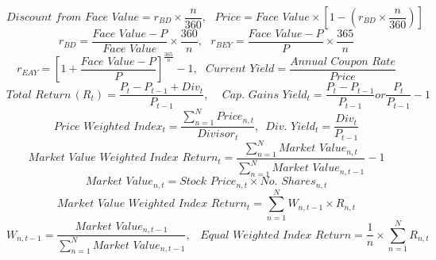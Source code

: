 $$Discount \,\, from \,\, Face \,\, Value = r_{BD} \times \frac{n}{360}, \,\,\,\, Price = Face\,\, Value \times \left[1 - (r_{BD} \times \frac{n}{360})\right]$$
$$r_{BD} = \frac{Face \,\, Value - P}{Face \,\, Value}\times \frac{360}{n},\,\,\,\, r_{BEY} = \frac{Face \,\, Value - P}{P}\times \frac{365}{n}$$
$$r_{EAY} = \left[1 + \frac{Face \,\, Value - P}{P} \right]^{\frac{365}{n}}-1, \,\,\,\, Current \,\, Yield = \frac{Annual \,\, Coupon \,\, Rate}{Price}$$
$$Total \,\, Return \, (R_{t}) = \frac{P_{t}-P_{t-1}+Div_{t}}{P_{t-1}},  \,\,\,\,\,\,\, Cap. \,\, Gains \,\, Yield_{t} = \frac{P_{t}- P_{t-1}}{P_{t-1}} or \frac{P_{t}}{P_{t-1}}-1$$
$$Price \,\, Weighted \,\, Index_{t} = \frac{\sum_{n=1}^{N}Price_{n,t}}{Divisor_{t}},\,\,\, Div. \,\, Yield_{t} = \frac{Div_{t}}{P_{t-1}}$$
$$Market \,\, Value \,\, Weighted \,\, Index \,\, Return_{t} = \frac{\sum_{n=1}^{N}Market \,\, Value_{n,t}}{\sum_{n=1}^{N}Market \,\, Value_{n,t-1}}-1$$
$$Market \,\, Value_{n,t} = Stock \,\, Price_{n,t} \times No. \,\, Shares_{n,t}$$
$$Market \,\, Value \,\, Weighted \,\, Index \,\, Return_{t} = \sum_{n=1}^{N} W_{n,t-1}\times R_{n,t}$$
$$W_{n,t-1} = \frac{Market \,\, Value_{n,t-1}}{\sum_{n=1}^{N}Market \,\, Value_{n,t-1}}, \,\,\,\,\, Equal \,\, Weighted \,\, Index \,\, Return = \frac{1}{n}\times \sum_{n=1}^{N}R_{n,t}$$